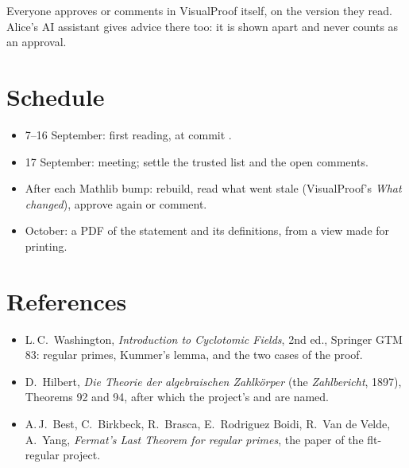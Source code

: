 Everyone approves or comments in VisualProof itself, on the version they read. Alice's AI
assistant gives advice there too: it is shown apart and never counts as an approval.

\section{Schedule}

\begin{itemize}
\item 7--16 September: first reading, at commit .
\item 17 September: meeting; settle the trusted list and the open comments.
\item After each Mathlib bump: rebuild, read what went stale (VisualProof's \emph{What changed}),
  approve again or comment.
\item October: a PDF of the statement and its definitions, from a view made for printing.
\end{itemize}

\section{References}

\begin{itemize}
\item L.\,C.~Washington, \emph{Introduction to Cyclotomic Fields}, 2nd ed., Springer GTM 83:
  regular primes, Kummer's lemma, and the two cases of the proof.
\item D.~Hilbert, \emph{Die Theorie der algebraischen Zahlkörper} (the \emph{Zahlbericht}, 1897),
  Theorems 92 and 94, after which the project's  and  are named.
\item A.\,J.~Best, C.~Birkbeck, R.~Brasca, E.~Rodriguez Boidi, R.~Van de Velde, A.~Yang,
  \emph{Fermat's Last Theorem for regular primes}, the paper of the flt-regular project.
\end{itemize}

\fictional

